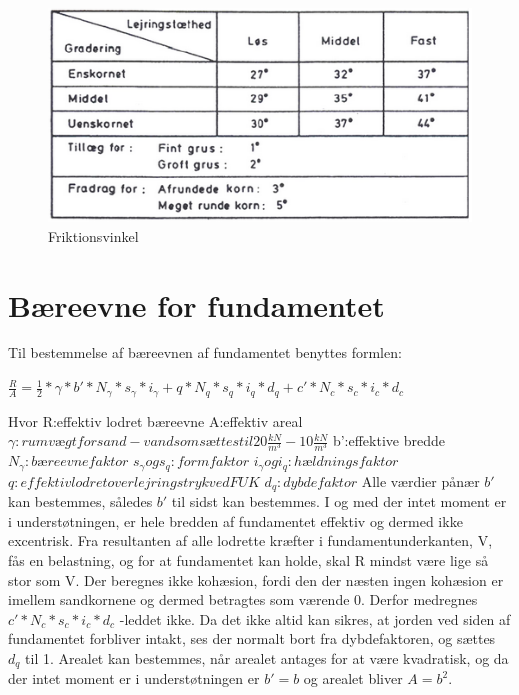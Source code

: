 \begin{figure}[htbp] \centering
	\begin{minipage}[b]{0.48\textwidth}\centering
		\includegraphics[width=1.2\textwidth]{billeder/friktionsvinkel.png}
		\caption{Friktionsvinkel \citep[ s. 170]{geoteknik}}
		\label{fig:friktionsvinkel}
	\end{minipage}\hfill
\end{figure}

\section{Bæreevne for fundamentet}
Til bestemmelse af bæreevnen af fundamentet benyttes formlen:
\begin{center}
	$\frac{R}{A}=\frac{1}{2}*\gamma*b'*N_\gamma*s_\gamma*i_\gamma+q*N_q*s_q*i_q*d_q+c'*N_c*s_c*i_c*d_c$
\end{center}

Hvor 
R:effektiv lodret bæreevne
A:effektiv areal 
$\gamma:rumvægt for sand - vand som sættes til 20\frac{kN}{m^3}-10\frac{kN}{m^3}$
b':effektive bredde
$N_\gamma:bæreevnefaktor $
$s_\gamma og s_q:formfaktor$
$i_\gamma og i_q:hældningsfaktor$
$q:effektiv lodret overlejringstryk ved FUK $
$d_q:dybdefaktor$
\newline
\newline
Alle værdier pånær $b'$ kan bestemmes, således $b'$ til sidst kan bestemmes.
I og med der intet moment er i understøtningen, er hele bredden af fundamentet effektiv og dermed ikke excentrisk. Fra resultanten af alle lodrette kræfter i fundamentunderkanten, V, fås en belastning, og for at fundamentet kan holde, skal R mindst være lige så stor som V.
Der beregnes ikke kohæsion, fordi den der næsten ingen kohæsion er imellem sandkornene og dermed betragtes som værende 0. Derfor medregnes $c'*N_c*s_c*i_c*d_c$ -leddet ikke.
Da det ikke altid kan sikres, at jorden ved siden af fundamentet forbliver intakt, ses der normalt bort fra dybdefaktoren, og sættes $d_q$ til 1.
Arealet kan bestemmes, når arealet antages for at være kvadratisk, og da der intet moment er i understøtningen er $b'=b$ og arealet bliver $A=b^2$.

